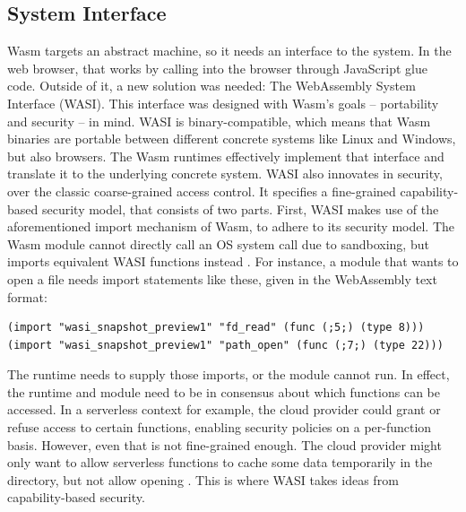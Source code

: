 
\subsection{System Interface}

Wasm targets an abstract machine, so it needs an interface to the system. In the web browser, that works by calling into the browser through JavaScript glue code. Outside of it, a new solution was needed: The WebAssembly System Interface (WASI). This interface was designed with Wasm's goals -- portability and security -- in mind.
WASI is binary-compatible, which means that Wasm binaries are portable between different concrete systems like Linux and Windows, but also browsers. The Wasm runtimes effectively implement that interface and translate it to the underlying concrete system.
WASI also innovates in security, over the classic coarse-grained access control. It specifies a fine-grained capability-based security model, that consists of two parts. First, WASI makes use of the aforementioned import mechanism of Wasm, to adhere to its security model. The Wasm module cannot directly call an OS system call due to sandboxing, but imports equivalent WASI functions instead \cite{Clark2019}. For instance, a module that wants to open a file needs import statements like these, given in the WebAssembly text format:

\begin{verbatim}
(import "wasi_snapshot_preview1" "fd_read" (func (;5;) (type 8)))
(import "wasi_snapshot_preview1" "path_open" (func (;7;) (type 22)))
\end{verbatim}

The runtime needs to supply those imports, or the module cannot run. In effect, the runtime and module need to be in consensus about which functions can be accessed. In a serverless context for example, the cloud provider could grant or refuse access to certain functions, enabling security policies on a per-function basis. However, even that is not fine-grained enough. The cloud provider might only want to allow serverless functions to cache some data temporarily in the  directory, but not allow opening . This is where WASI takes ideas from capability-based security.

